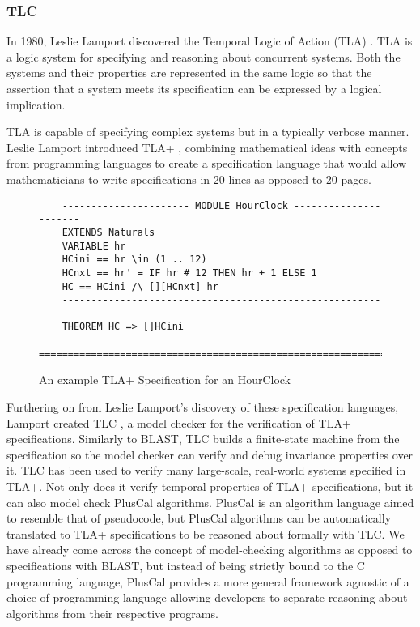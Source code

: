 \subsubsection*{\textbf{TLC}}
In 1980, Leslie Lamport discovered the Temporal Logic of Action (TLA) \cite{tla}. TLA is a logic system for specifying and reasoning about concurrent systems. Both the systems and their properties are represented in the same logic so that the assertion that a system meets its specification can be expressed by a logical implication.
\par
TLA is capable of specifying complex systems but in a typically verbose manner. Leslie Lamport introduced TLA+ \cite{tlaplus}, combining mathematical ideas with concepts from programming languages to create a specification language that would allow mathematicians to write specifications in 20 lines as opposed to 20 pages.
\begin{figure}[H]
    \begin{verbatim}
    ---------------------- MODULE HourClock ----------------------
    EXTENDS Naturals
    VARIABLE hr
    HCini == hr \in (1 .. 12)
    HCnxt == hr' = IF hr # 12 THEN hr + 1 ELSE 1
    HC == HCini /\ [][HCnxt]_hr
    --------------------------------------------------------------
    THEOREM HC => []HCini
    ==============================================================
    \end{verbatim}
    \caption{An example TLA+ Specification for an HourClock \cite{tlaplus}}
    \label{fig:hourclock_spec}
\end{figure}
\par
Furthering on from Leslie Lamport's discovery of these specification languages, Lamport created TLC \cite{tlc}, a model checker for the verification of TLA+ specifications. Similarly to BLAST, TLC builds a finite-state machine from the specification so the model checker can verify and debug invariance properties over it. TLC has been used to verify many large-scale, real-world systems specified in TLA+. Not only does it verify temporal properties of TLA+ specifications, but it can also model check PlusCal \cite{pluscal} algorithms. PlusCal is an algorithm language aimed to resemble that of pseudocode, but PlusCal algorithms can be automatically translated to TLA+ specifications to be reasoned about formally with TLC. We have already come across the concept of model-checking algorithms as opposed to specifications with BLAST, but instead of being strictly bound to the C programming language, PlusCal provides a more general framework agnostic of a choice of programming language allowing developers to separate reasoning about algorithms from their respective programs.


